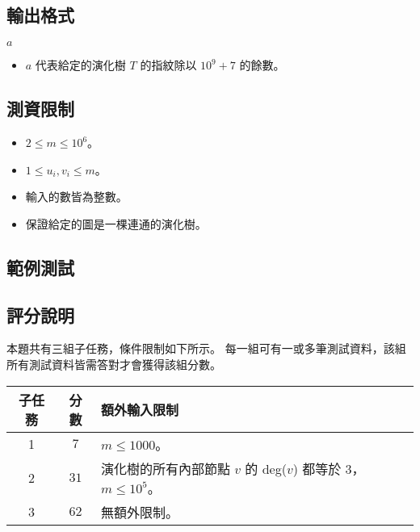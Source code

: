 \subsection{輸出格式}

\begin{format}
\f{
$a$
}
\end{format}

\begin{itemize}
\tightlist
\item
  \(a\) 代表給定的演化樹 \(T\) 的指紋除以 \(10^9 + 7\) 的餘數。
\end{itemize}

\subsection{測資限制}

\begin{itemize}
\tightlist
\item
  \begin{math}2 \le m \le 10^6\end{math}。
\item
  \begin{math}1 \le u_i, v_i \le m\end{math}。
\item
  輸入的數皆為整數。
\item
  保證給定的圖是一棵連通的演化樹。
\end{itemize}

\subsection{範例測試}

\begin{example}
%
%
\end{example}

\subsection{評分說明}

本題共有三組子任務，條件限制如下所示。
每一組可有一或多筆測試資料，該組所有測試資料皆需答對才會獲得該組分數。

\begin{longtable}[]{@{}ccl@{}}
\toprule
子任務 & 分數 & 額外輸入限制 \\
\midrule
\endhead
1 & \(7\) & \begin{math}m \le 1000\end{math}。 \\
2 & \(31\) & 演化樹的所有內部節點 \(v\) 的 deg(\(v\)) 都等於
\(3\)，\(m \le 10^5\)。 \\
3 & \(62\) & 無額外限制。 \\
\bottomrule
\end{longtable}

